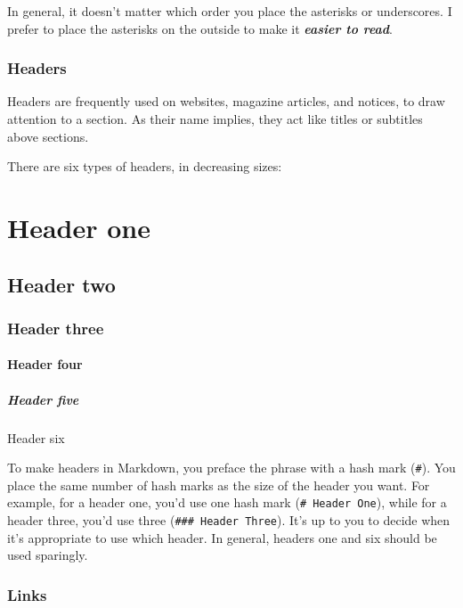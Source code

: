 \documentclass[
]{article}
\begin{document}
In general, it doesn't matter which order you place the asterisks or
underscores. I prefer to place the asterisks on the outside to make it
\textbf{\emph{easier to read}}.

\hypertarget{headers}{%
\subsubsection{Headers}\label{headers}}

Headers are frequently used on websites, magazine articles, and notices,
to draw attention to a section. As their name implies, they act like
titles or subtitles above sections.

There are six types of headers, in decreasing sizes:

\hypertarget{header-one}{%
\section{Header one}\label{header-one}}

\hypertarget{header-two}{%
\subsection{Header two}\label{header-two}}

\hypertarget{header-three}{%
\subsubsection{Header three}\label{header-three}}

\hypertarget{header-four}{%
\paragraph{Header four}\label{header-four}}

\hypertarget{header-five}{%
\subparagraph{Header five}\label{header-five}}

Header six

To make headers in Markdown, you preface the phrase with a hash mark
(\texttt{\#}). You place the same number of hash marks as the size of
the header you want. For example, for a header one, you'd use one hash
mark (\texttt{\#\ Header\ One}), while for a header three, you'd use
three (\texttt{\#\#\#\ Header\ Three}). It's up to you to decide when
it's appropriate to use which header. In general, headers one and six
should be used sparingly.

\hypertarget{links}{%
\subsubsection{Links}\label{links}}
\end{document}
